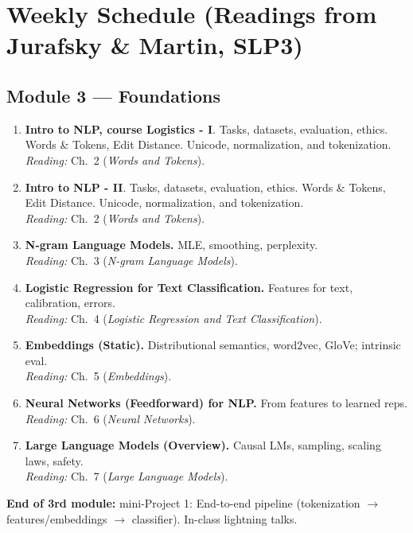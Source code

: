 \documentclass[12pt]{article}
\begin{document}
\section*{Weekly Schedule (Readings from Jurafsky \& Martin, SLP3)}
\subsection*{Module 3 — Foundations}
\begin{enumerate}[label=\textbf{Week \arabic*.}, leftmargin=*]
  \item \textbf{Intro to NLP, course Logistics - I}.
  Tasks, datasets, evaluation, ethics.
  Words \& Tokens, Edit Distance. Unicode, normalization, and tokenization. \\
        \emph{Reading:} Ch.\ 2 (\emph{Words and Tokens}).   
    \item \textbf{Intro to NLP - II}.
    Tasks, datasets, evaluation, ethics.
    Words \& Tokens, Edit Distance. Unicode, normalization, and tokenization. \\
    \emph{Reading:} Ch.\ 2 (\emph{Words and Tokens}). 
  \item \textbf{N-gram Language Models.} MLE, smoothing, perplexity.\\
        \emph{Reading:} Ch.\ 3 (\emph{N-gram Language Models}).
  \item \textbf{Logistic Regression for Text Classification.} Features for text, calibration, errors.\\
        \emph{Reading:} Ch.\ 4 (\emph{Logistic Regression and Text Classification}).
  \item \textbf{Embeddings (Static).} Distributional semantics, word2vec, GloVe; intrinsic eval.\\
        \emph{Reading:} Ch.\ 5 (\emph{Embeddings}).
  \item \textbf{Neural Networks (Feedforward) for NLP.} From features to learned reps.\\
        \emph{Reading:} Ch.\ 6 (\emph{Neural Networks}).
  \item \textbf{Large Language Models (Overview).} Causal LMs, sampling, scaling laws, safety.\\
        \emph{Reading:} Ch.\ 7 (\emph{Large Language Models}). \\
\end{enumerate}

\textbf{End of 3rd module:} mini-Project 1: End-to-end pipeline (tokenization $\rightarrow$ features/embeddings $\rightarrow$ classifier). In-class lightning talks.
\end{document}
